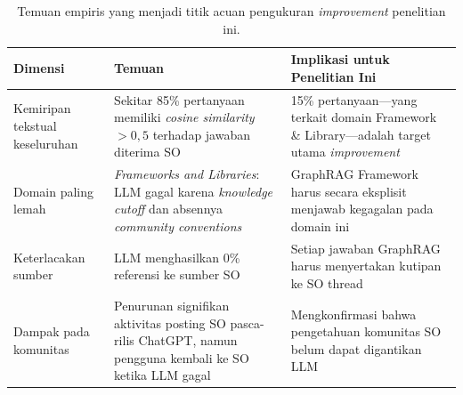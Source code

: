 \begin{table}[!htbp]
\centering
\caption{Temuan empiris \textcite{DaSilva2025} yang menjadi titik acuan
pengukuran \emph{improvement} penelitian ini.}
\label{tab:analisis-keterbatasan-baseline}
\begin{tabularx}{\textwidth}{|X|X|X|}
\hline
\textbf{Dimensi} & \textbf{Temuan} & \textbf{Implikasi untuk Penelitian Ini} \\
\hline
Kemiripan tekstual keseluruhan &
Sekitar 85\% pertanyaan memiliki \emph{cosine similarity} $> 0{,}5$
terhadap jawaban diterima SO &
15\% pertanyaan—yang terkait domain Framework \& Library—adalah target
utama \emph{improvement} \\
\hline
Domain paling lemah &
\emph{Frameworks and Libraries}: LLM gagal karena \emph{knowledge
cutoff} dan absennya \emph{community conventions} &
GraphRAG Framework harus secara eksplisit menjawab kegagalan pada domain ini \\
\hline
Keterlacakan sumber &
LLM menghasilkan 0\% referensi ke sumber SO &
Setiap jawaban GraphRAG harus menyertakan kutipan ke SO thread \\
\hline
Dampak pada komunitas &
Penurunan signifikan aktivitas posting SO pasca-rilis ChatGPT, namun
pengguna kembali ke SO ketika LLM gagal &
Mengkonfirmasi bahwa pengetahuan komunitas SO belum dapat digantikan LLM \\
\hline
\end{tabularx}
\end{table}